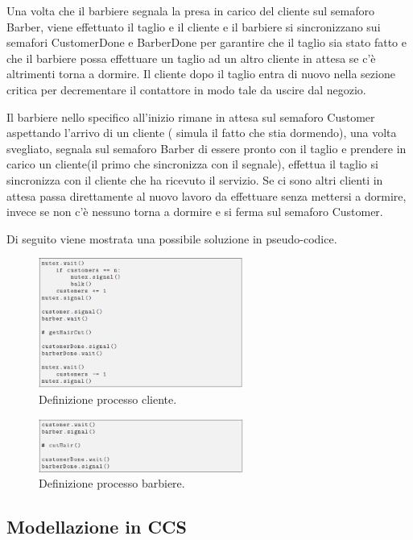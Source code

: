 Una volta che il barbiere segnala la presa in carico del cliente sul semaforo Barber, viene effettuato il taglio e il cliente e il barbiere si sincronizzano sui semafori CustomerDone e BarberDone per garantire che il taglio sia stato fatto e che il barbiere possa effettuare un taglio ad un altro cliente in attesa se c'è altrimenti torna a dormire. Il cliente dopo il taglio entra di nuovo nella sezione critica per decrementare il contattore in modo tale da uscire dal negozio.

Il barbiere nello specifico all'inizio rimane in attesa sul semaforo Customer aspettando l'arrivo di un cliente ( simula il fatto che stia dormendo), una volta svegliato, segnala sul semaforo Barber di essere pronto con il taglio e prendere in carico un cliente(il primo che sincronizza con il segnale), effettua il taglio si sincronizza con il cliente che ha ricevuto il servizio. Se ci sono altri clienti in attesa passa direttamente al nuovo lavoro da effettuare senza mettersi a dormire, invece se non c'è nessuno torna a dormire e si ferma sul semaforo Customer.

\pagebreak
Di seguito viene mostrata una possibile soluzione in pseudo-codice.


\begin{figure}[h]
	\centering
	\includegraphics[width=0.6\textwidth]{Figure/2.png}
	\caption{Definizione processo cliente.}
\end{figure}

\begin{figure}[h]
	\centering
	\includegraphics[width=0.6\textwidth]{Figure/3.png}
	\caption{Definizione processo barbiere.}
\end{figure}
\subsection{Modellazione in CCS}

